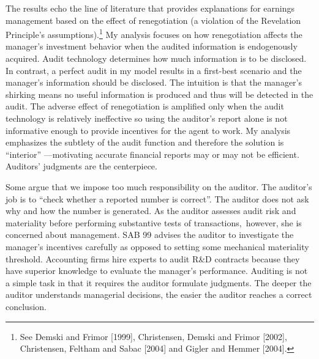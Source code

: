 The results echo the line of literature that provides explanations
for earnings management based on the effect of renegotiation (a
violation of the
Revelation Principle's assumptions).\footnote{%
See Demski and Frimor [1999], Christensen, Demski and Frimor [2002],
Christensen, Feltham and Sabac [2004] and Gigler and Hemmer [2004].}
My analysis focuses on how renegotiation affects the manager's
investment behavior when the audited information is endogenously
acquired. Audit technology determines how much information is to be
disclosed. In contrast, a perfect audit in my model results in a
first-best scenario and the manager's information should be
disclosed. The intuition is that the manager's shirking means no
useful information is produced and thus will be detected in the
audit. The adverse effect of renegotiation is amplified only when
the audit technology is relatively ineffective so using the
auditor's report alone is not informative enough to provide
incentives for the agent to work. My analysis emphasizes the
subtlety of the audit function and therefore the solution is
\textquotedblleft interior\textquotedblright
---motivating accurate financial reports may or may not be efficient.
Auditors' judgments are the centerpiece.

Some argue that we impose too much responsibility on the auditor.
The auditor's job is to \textquotedblleft check whether a reported
number is correct\textquotedblright . The auditor does not ask why
and how the number is generated. As the auditor assesses audit risk
and materiality before performing substantive tests of
transactions,\ however, she is concerned about management. SAB 99
advises the auditor to investigate the manager's incentives
carefully as opposed to setting some mechanical materiality
threshold. Accounting firms hire experts to audit R\&D contracts
because they have superior knowledge to evaluate the manager's
performance. Auditing is not a simple task in that it requires the
auditor formulate judgments. The deeper the auditor understands
managerial decisions, the easier the auditor reaches a correct
conclusion.

